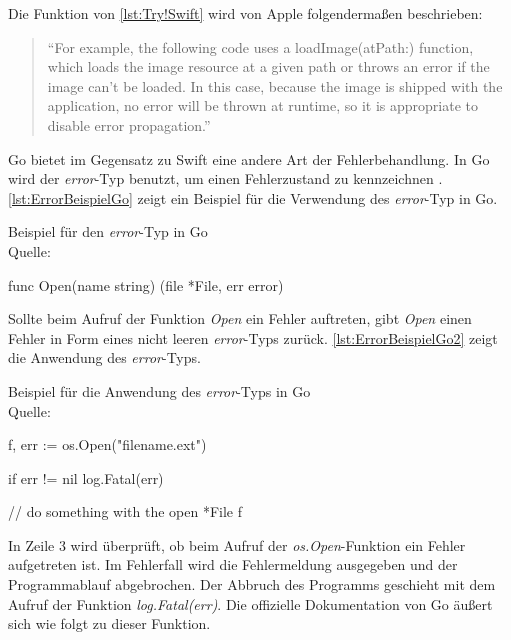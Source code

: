 Die Funktion von \autoref{lst:Try!Swift} wird von Apple folgendermaßen beschrieben:

\begin{quote}
\enquote{For example, the following code uses a  loadImage(atPath:) function, which loads the image
resource at a given path or throws an error if the image can’t be loaded. In this case, because the
image is shipped with the application, no error will be thrown at runtime, so it is appropriate to
disable error propagation.} \cite[S.317]{Apple.2017}
\end{quote}

Go bietet im Gegensatz zu Swift eine andere Art der Fehlerbehandlung.
In Go wird der \textit{error}-Typ benutzt, um einen Fehlerzustand zu kennzeichnen \cite[]{GoBlog.ErroHandling}.
\autoref{lst:ErrorBeispielGo} zeigt ein Beispiel für die Verwendung des \textit{error}-Typ in Go. 

\begin{listing}[H]
\caption{Beispiel für den \textit{error}-Typ in Go \\ Quelle:\cite[]{GoBlog.ErroHandling}}
\label{lst:ErrorBeispielGo}
\begin{GoCode}
func Open(name string) (file *File, err error)
\end{GoCode}
\end{listing}

Sollte beim Aufruf der Funktion \textit{Open} ein Fehler auftreten, gibt \textit{Open} einen Fehler in Form eines nicht leeren \textit{error}-Typs zurück.
\autoref{lst:ErrorBeispielGo2} zeigt die Anwendung des \textit{error}-Typs.

\begin{listing}[H]
\caption{Beispiel für die Anwendung des \textit{error}-Typs in Go \\ Quelle:\cite[]{GoBlog.ErroHandling}}
\label{lst:ErrorBeispielGo2}
\begin{GoCode}
f, err := os.Open("filename.ext")

if err != nil {
    log.Fatal(err)
}

// do something with the open *File f
\end{GoCode}
\end{listing}

In Zeile 3 wird überprüft, ob beim Aufruf der \textit{os.Open}-Funktion ein Fehler aufgetreten ist. 
Im Fehlerfall wird die Fehlermeldung ausgegeben und der Programmablauf abgebrochen.
Der Abbruch des Programms geschieht mit dem Aufruf der Funktion \textit{log.Fatal(err)}.
Die offizielle Dokumentation von Go äußert sich wie folgt zu dieser Funktion.

